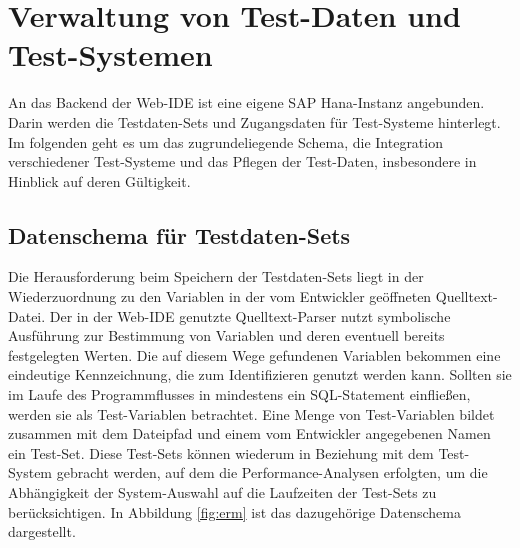 \section{Verwaltung von Test-Daten und Test-Systemen}\label{chap:testdataadministration}

%
%

An das Backend der Web-IDE ist eine eigene SAP Hana-Instanz angebunden.
Darin werden die Testdaten-Sets und Zugangsdaten für Test-Systeme hinterlegt.
Im folgenden geht es um das zugrundeliegende Schema, die Integration verschiedener Test-Systeme und das Pflegen der Test-Daten, insbesondere in Hinblick auf deren Gültigkeit.

\subsection{Datenschema für Testdaten-Sets}
Die Herausforderung beim Speichern der Testdaten-Sets liegt in der Wiederzuordnung zu den Variablen in der vom Entwickler geöffneten Quelltext-Datei.
Der in der Web-IDE genutzte Quelltext-Parser \cite{Horschig2014} nutzt symbolische Ausführung \cite{DBLP:journals/cacm/King76} zur Bestimmung von Variablen und deren eventuell bereits festgelegten Werten.
Die auf diesem Wege gefundenen Variablen bekommen eine eindeutige Kennzeichnung, die zum Identifizieren genutzt werden kann.
Sollten sie im Laufe des Programmflusses in mindestens ein SQL-Statement einfließen, werden sie als Test-Variablen betrachtet.
Eine Menge von Test-Variablen bildet zusammen mit dem Dateipfad und einem vom Entwickler angegebenen Namen ein Test-Set.
Diese Test-Sets können wiederum in Beziehung mit dem Test-System gebracht werden, auf dem die Performance-Analysen erfolgten, um die Abhängigkeit der System-Auswahl auf die Laufzeiten der Test-Sets zu berücksichtigen.
In Abbildung \ref{fig:erm} ist das dazugehörige Datenschema dargestellt.

\newcommand {\key}[1]{\underline{#1}}

